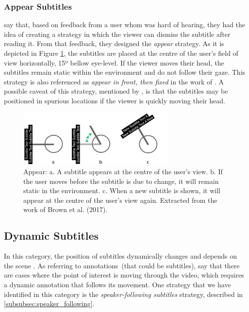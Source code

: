 \subsubsection{Appear Subtitles}
\label{subsubsection:appear_subtitles}

\cite{brown_subtitles_2017} say that, based on feedback from a user whom was hard of hearing, they had the idea of creating a strategy in which the viewer can dismiss the subtitle after reading it. From that feedback, they designed the \emph{appear} strategy. As it is depicted in Figure \ref{fig:appear_subtitle}, the subtitles are placed at the centre of the user's field of view horizontally, 15º bellow eye-level. If the viewer moves their head, the subtitles remain static within the environment and do not follow their gaze. This strategy is also referenced as \emph{appear in front, then fixed} in the work of \cite{montagud_culture_2020}. A possible caveat of this strategy, mentioned by \cite{brown_subtitles_2017}, is that the subtitles may be positioned in spurious locations if the viewer is quickly moving their head.

\begin{figure}[!ht]
    \centering
    \includegraphics[width=0.7\textwidth]{img/video360/appear.png}
    \caption{Appear: a. A subtitle appears at the centre of the user's view. b. If the user moves before the subtitle is due to change, it will remain static in the environment. c. When a new subtitle is shown, it will appear at the centre of the user's view again. Extracted from the work of Brown et al. (2017).}
    \label{fig:appear_subtitle}
\end{figure}

\subsection{Dynamic Subtitles}
\label{subsection:dynamic_subtitles}

In this category, the position of subtitles dynamically changes and depends on the scene \cite{rothe_dynamic_2018}. As referring to annotations~(that could be subtitles), \cite{matos_dynamic_2018} say that there are cases where the point of interest is moving through the video, which requires a dynamic annotation that follows its movement. One strategy that we have identified in this category is the \emph{speaker-following subtitles} strategy, described in \ref{subsubsec:speaker_following}.

